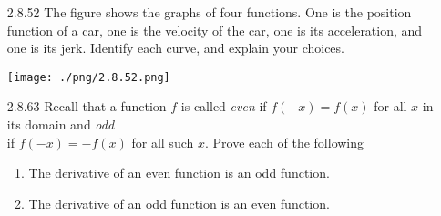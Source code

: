 \documentclass{article}
\begin{document}
\begin{enumerate}
    \newpage

    \item[2.8.52]
        The figure shows the graphs of four functions.
        One is the position function of a car, one is the velocity of the car, one is its acceleration, and one is its jerk.
        Identify each curve, and explain your choices.

        \begin{center}
            \texttt{[image: ./png/2.8.52.png]}
        \end{center}

    \vspace{6cm}

    \item[2.8.63]
        Recall that a function $f$ is called \textit{even} if $f(-x)=f(x)$ for all $x$ in its domain
        and \textit{odd} \\ if $f(-x)=-f(x)$ for all such $x$. Prove each of the following

        \begin{enumerate}
            \item The derivative of an even function is an odd function.
            \item The derivative of an odd function is an even function.
        \end{enumerate}


\end{enumerate}
\end{document}
